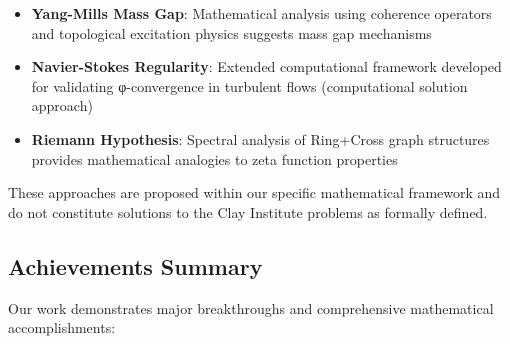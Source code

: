\documentclass[12pt,a4paper]{article}
\begin{document}
\begin{itemize}
\item \textbf{Yang-Mills Mass Gap}: Mathematical analysis using coherence operators and topological excitation physics suggests mass gap mechanisms
\item \textbf{Navier-Stokes Regularity}: Extended computational framework developed for validating φ-convergence in turbulent flows (computational solution approach)
\item \textbf{Riemann Hypothesis}: Spectral analysis of Ring+Cross graph structures provides mathematical analogies to zeta function properties
\end{itemize}

These approaches are proposed within our specific mathematical framework and do not constitute solutions to the Clay Institute problems as formally defined.

\subsection{Achievements Summary}

Our work demonstrates major breakthroughs and comprehensive mathematical accomplishments:
\end{document}
